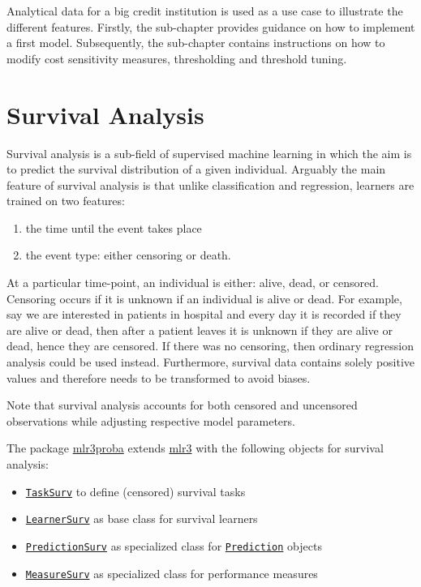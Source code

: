 \documentclass[
]{scrbook}
\providecommand{\tightlist}{%
  \setlength{\itemsep}{0pt}\setlength{\parskip}{0pt}}
\begin{document}
Analytical data for a big credit institution is used as a use case to illustrate the different features.
Firstly, the sub-chapter provides guidance on how to implement a first model.
Subsequently, the sub-chapter contains instructions on how to modify cost sensitivity measures, thresholding and threshold tuning.

\hypertarget{survival}{%
\section{Survival Analysis}\label{survival}}

Survival analysis is a sub-field of supervised machine learning in which the aim is to predict the survival distribution of a given individual.
Arguably the main feature of survival analysis is that unlike classification and regression, learners are trained on two features:

\begin{enumerate}
\def\labelenumi{\arabic{enumi}.}
\tightlist
\item
  the time until the event takes place
\item
  the event type: either censoring or death.
\end{enumerate}

At a particular time-point, an individual is either: alive, dead, or censored.
Censoring occurs if it is unknown if an individual is alive or dead.
For example, say we are interested in patients in hospital and every day it is recorded if they are alive or dead, then after a patient leaves it is unknown if they are alive or dead, hence they are censored.
If there was no censoring, then ordinary regression analysis could be used instead.
Furthermore, survival data contains solely positive values and therefore needs to be transformed to avoid biases.

Note that survival analysis accounts for both censored and uncensored observations while adjusting respective model parameters.

The package \href{https://mlr3proba.mlr-org.com}{mlr3proba} extends \href{https://mlr3.mlr-org.com}{mlr3} with the following objects for survival analysis:

\begin{itemize}
\tightlist
\item
  \href{https://mlr3proba.mlr-org.com/reference/TaskSurv.html}{\texttt{TaskSurv}} to define (censored) survival tasks
\item
  \href{https://mlr3proba.mlr-org.com/reference/LearnerSurv.html}{\texttt{LearnerSurv}} as base class for survival learners
\item
  \href{https://mlr3proba.mlr-org.com/reference/PredictionSurv.html}{\texttt{PredictionSurv}} as specialized class for \href{https://mlr3.mlr-org.com/reference/Prediction.html}{\texttt{Prediction}} objects
\item
  \href{https://mlr3proba.mlr-org.com/reference/MeasureSurv.html}{\texttt{MeasureSurv}} as specialized class for performance measures
\end{itemize}
\end{document}
